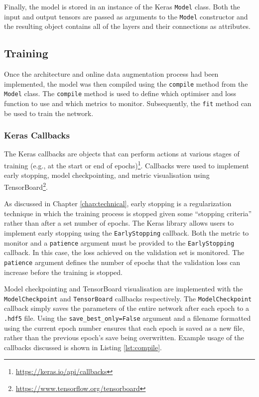 Finally, the model is stored in an instance of the Keras \texttt{Model} class. Both the input and output tensors are passed as arguments to the \texttt{Model} constructor and the resulting object contains all of the layers and their connections as attributes.


\subsection{Training}

Once the architecture and online data augmentation process had been implemented, the model was then compiled using the \texttt{compile} method from the \texttt{Model} class. The \texttt{compile} method is used to define which optimiser and loss function to use and which metrics to monitor. Subsequently, the \texttt{fit} method can be used to train the network.

\subsubsection{Keras Callbacks}

The Keras callbacks are objects that can perform actions at various stages of training (e.g., at the start or end of epochs)\footnote{\url{https://keras.io/api/callbacks}}. Callbacks were used to implement early stopping, model checkpointing, and metric visualisation using TensorBoard\footnote{\url{https://www.tensorflow.org/tensorboard}}.

As discussed in Chapter \ref{chap:technical}, early stopping is a regularization technique in which the training process is stopped given some ``stopping criteria'' rather than after a set number of epochs. The Keras library allows users to implement early stopping using the \texttt{EarlyStopping} callback. Both the metric to monitor and a \texttt{patience} argument must be provided to the \texttt{EarlyStopping} callback. In this case, the loss achieved on the validation set is monitored. The \texttt{patience} argument defines the number of epochs that the validation loss can increase before the training is stopped.

Model checkpointing and TensorBoard visualisation are implemented with the \texttt{ModelCheckpoint} and \texttt{TensorBoard} callbacks respectively. The \texttt{ModelCheckpoint} callback simply saves the parameters of the entire network after each epoch to a \texttt{.hdf5} file. Using the \texttt{save\_best\_only=False} argument and a filename formatted using the current epoch number ensures that each epoch is saved as a new file, rather than the previous epoch's save being overwritten. Example usage of the callbacks discussed is shown in Listing \ref{lst:compile}.

